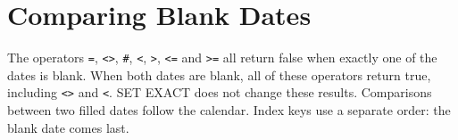 \section{Comparing Blank Dates}
The operators \texttt{=}, \texttt{<>}, \texttt{\#}, \texttt{<},
\texttt{>}, \texttt{<=} and \texttt{>=} all return false when exactly one
of the dates is blank. When both dates are blank, all of these operators
return true, including \texttt{<>} and \texttt{<}. SET EXACT does not
change these results. Comparisons between two filled dates follow the
calendar. Index keys use a separate order: the blank date comes last.

